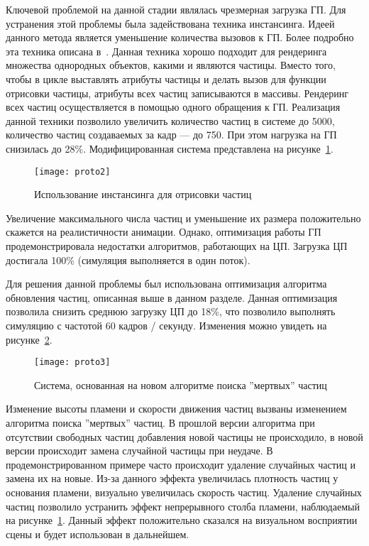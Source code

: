 Ключевой проблемой на данной стадии являлась чрезмерная загрузка ГП. Для
устранения этой проблемы была задействована техника инстансинга. Идеей данного
метода является уменьшение количества вызовов к ГП. Более подробно
эта техника описана в~\cite{OGLSuperbible,LearnOGL}. Данная техника хорошо
подходит для рендеринга множества однородных объектов, какими и являются
частицы. Вместо того, чтобы в цикле выставлять атрибуты частицы и делать вызов
для функции отрисовки частицы, атрибуты всех частиц записываются в массивы.
Рендеринг всех частиц осуществляется в помощью одного обращения к ГП. Реализация
данной техники позволило увеличить количество частиц в системе до 5000,
количество частиц создаваемых за кадр --- до 750. При этом нагрузка на ГП
снизилась до 28\%. Модифицированная система представлена на
рисунке~\ref{fig:proto2}.
\begin{figure}[htb]
	\centering
    \texttt{[image: proto2]}
    \caption{Использование инстансинга для отрисовки частиц}%
    \label{fig:proto2}
\end{figure}

Увеличение максимального числа частиц и уменьшение их размера положительно
скажется на реалистичности анимации. Однако, оптимизация работы ГП
продемонстрировала недостатки алгоритмов, работающих на ЦП. Загрузка ЦП
достигала 100\% (симуляция выполняется в один поток).

Для решения данной проблемы был использована оптимизация алгоритма обновления
частиц, описанная выше в данном разделе. Данная оптимизация позволила снизить
среднюю загрузку ЦП до 18\%, что позволило выполнять симуляцию с частотой 60
кадров / секунду. Изменения можно увидеть на рисунке~\ref{fig:proto3}.
\begin{figure}[htb]
	\centering
    \texttt{[image: proto3]}
    \caption{Система, основанная на новом алгоритме поиска ''мертвых'' частиц}%
    \label{fig:proto3}
\end{figure}

Изменение высоты пламени и скорости движения частиц вызваны изменением алгоритма
поиска ''мертвых'' частиц. В прошлой версии алгоритма при отсутствии свободных
частиц добавления новой частицы не происходило, в новой версии происходит замена
случайной частицы при неудаче. В продемонстрированном примере часто происходит
удаление случайных частиц и замена их на новые. Из-за данного эффекта
увеличилась плотность частиц у основания пламени, визуально увеличилась скорость
частиц. Удаление случайных частиц позволило устранить эффект непрерывного столба
пламени, наблюдаемый на рисунке~\ref{fig:proto2}. Данный эффект положительно
сказался на визуальном восприятии сцены и будет использован в дальнейшем.

